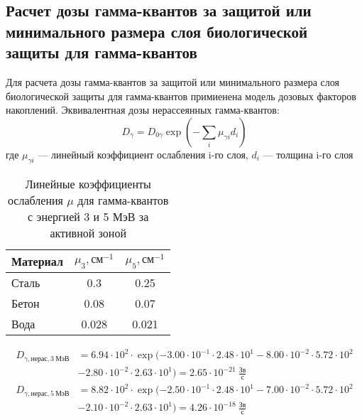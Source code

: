 \subsection{Расчет дозы гамма-квантов за защитой или минимального размера слоя биологической защиты для гамма-квантов}
Для расчета дозы гамма-квантов за защитой или минимального размера слоя биологической защиты для гамма-квантов примиенена модель дозовых факторов накоплений.
Эквивалентная дозы нерассеянных гамма-квантов:
\begin{equation}
        D_\gamma = D_{0\gamma}\exp\left(
                -\sum_i\mu_{\gamma i} d_i
        \right)
\end{equation}
\noindent где $\mu_{\gamma i}$ — линейный коэффициент ослабления i-го слоя, $d_i$ — толщина i-го слоя
\begin{table}[H]
	\caption{Линейные коэффициенты ослабления $\mu$ для гамма-квантов с энергией 3 и 5 МэВ за активной зоной}
	\begin{center}
        \begin{tabular}{|l|c|c|}
        \toprule
         Материал & $\mu_3, \text{см}^{-1}$ & $\mu_5, \text{см}^{-1}$ \\
         \midrule
         \hline
         Сталь & 0.3 & 0.25 \\
         \hline
         Бетон & 0.08 & 0.07\\
         \hline
         Вода & 0.028 & 0.021\\
         \bottomrule
		\end{tabular}
		\label{tabular:koeff_oslab_2}
	\end{center}
\end{table}
\begin{align*}
        D_{\gamma, \text{нерас}, 3\ \text{МэВ}} &= 6.94 \cdot 10^{{ 2 }} \cdot \exp (
                - 3.00 \cdot 10^{{ -1 }} \cdot 2.48 \cdot 10^{{ 1 }}
                - 8.00 \cdot 10^{{ -2 }} \cdot 5.72 \cdot 10^{{ 2 }}
                \\ &- 2.80 \cdot 10^{{ -2 }} \cdot 2.63 \cdot 10^{{ 1 }}
        ) = 2.65 \cdot 10^{{ -21 }}\ \frac{\text{Зв} }{\text{с}} \\
        D_{\gamma, \text{нерас}, 5\ \text{МэВ}} &= 8.82 \cdot 10^{{ 2 }} \cdot \exp (
                - 2.50 \cdot 10^{{ -1 }} \cdot 2.48 \cdot 10^{{ 1 }}
                - 7.00 \cdot 10^{{ -2 }} \cdot 5.72 \cdot 10^{{ 2 }}
                \\ &- 2.10 \cdot 10^{{ -2 }} \cdot 2.63 \cdot 10^{{ 1 }}
        ) = 4.26 \cdot 10^{{ -18 }}\ \frac{\text{Зв} }{\text{с} }        
\end{align*}
